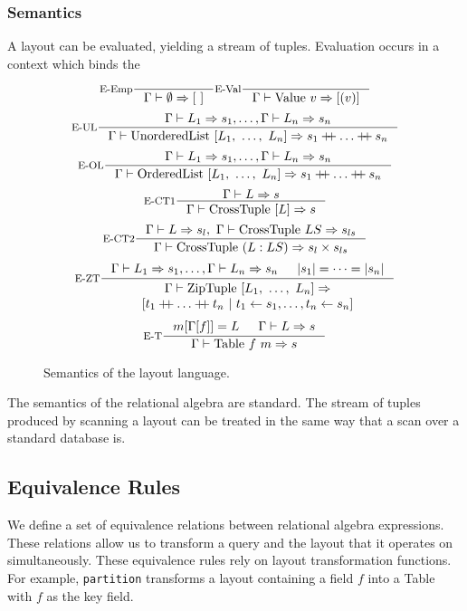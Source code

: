 \subsubsection{Semantics}

A layout can be evaluated, yielding a stream of tuples. Evaluation occurs in a
context which binds the

\begin{figure}
  \[
    \inference[E-Emp]{}{\Gamma |- \emptyset => [\ ]}
    \inference[E-Val]{}{\Gamma |- \text{Value}\ v => [(v)]}
  \]
  \[
    \inference[E-UL]{\Gamma |- L_1 => s_1, \dots, \Gamma |- L_n => s_n}{\Gamma |- \text{UnorderedList}\ [L_1,\ \dots,\ L_n] =>
      s_1 \concat \dots \concat s_n}
  \]
  \[
    \inference[E-OL]{\Gamma |- L_1 => s_1, \dots, \Gamma |- L_n => s_n}{\Gamma |- \text{OrderedList}\ [L_1,\ \dots,\ L_n] =>
      s_1 \concat \dots \concat s_n}
  \]
  \[
    \inference[E-CT1]{\Gamma |- L => s}{\Gamma |- \text{CrossTuple}\ [L] =>
      s}
  \]
  \[
    \inference[E-CT2]{\Gamma |- L => s_l,\ \Gamma |- \text{CrossTuple}\ LS => s_{ls}}{\Gamma |- \text{CrossTuple}\ (L:LS) =>
      s_l \times s_{ls}}
  \]
  \[
    \inference[E-ZT]{\Gamma |- L_1 => s_1, \dots, \Gamma |- L_n => s_n & |s_1| =
    \dots = |s_n|}{
      \begin{array}{c}
        \Gamma |- \text{ZipTuple}\ [L_1,\ \dots,\ L_n] => \\
        {[t_1\concat \dots \concat t_n\ |\ t_1 \leftarrow s_1, \dots, t_n \leftarrow s_n]}
      \end{array}
    }
  \]
  \[
    \inference[E-T]{m[\Gamma[f]] = L & \Gamma |- L => s}{
      \Gamma |- \text{Table}\ f\ m => s
    }
  \]
  \caption{Semantics of the layout language.}
\end{figure}

The semantics of the relational algebra are standard.
The stream of tuples produced by scanning a layout can be treated in the same
way that a scan over a standard database is.

\subsection{Equivalence Rules}
\label{sec:rules}

We define a set of equivalence relations between relational algebra expressions.
These relations allow us to transform a query and the layout that it operates on
simultaneously.
These equivalence rules rely on layout transformation functions.
For example, \texttt{partition} transforms a layout containing a field $f$ into
a Table with $f$ as the key field.

